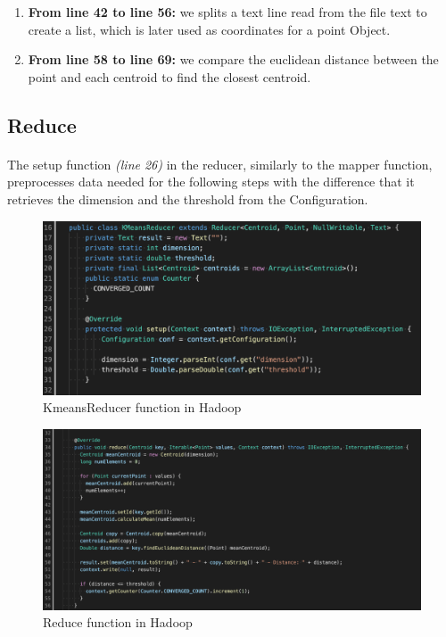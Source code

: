 \documentclass{book}
\begin{document}
    \begin{enumerate}
        \item \textbf{From line 42 to line 56:} we splits a text line read from the file text to create a list, which is later used as coordinates for a point Object. 
        \item \textbf{From line 58 to line 69:} we compare the euclidean distance between the point and each centroid to find the closest centroid. 
    \end{enumerate}

    \subsection{Reduce}
    \paragraph{}
    
    The setup function \textit{(line 26)} in the reducer, similarly to the mapper function, preprocesses data needed for the following steps with the difference that it retrieves the dimension and the threshold from the Configuration.

    \begin{figure}[H]
        \includegraphics[width=12cm]{code/KmeansReducer}
        \centering
        \caption{KmeansReducer function in Hadoop}
    \end{figure}

    \begin{figure}[H]
        \includegraphics[width=12cm]{code/reduce}
        \centering
        \caption{Reduce function in Hadoop}
    \end{figure}
\end{document}
